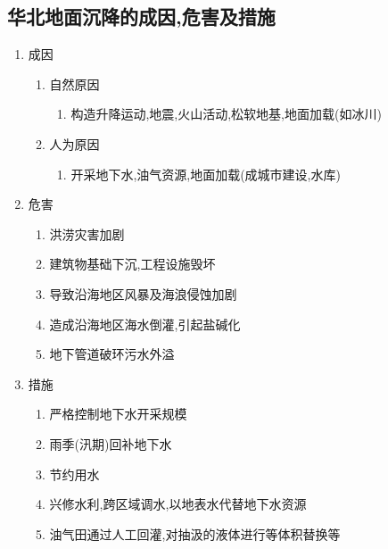 \documentclass[a4paper]{article}
\begin{document}
    \subsection{华北地面沉降的成因,危害及措施}
    \begin{enumerate}
        \item 成因
        \begin{enumerate}
            \item 自然原因
            \begin{enumerate}
                \item 构造升降运动,地震,火山活动,松软地基,地面加载(如冰川)
            \end{enumerate}
            \item 人为原因
            \begin{enumerate}
                \item 开采地下水,油气资源,地面加载(成城市建设,水库)
            \end{enumerate}
        \end{enumerate}
        \item 危害
        \begin{enumerate}
            \item 洪涝灾害加剧
            \item 建筑物基础下沉,工程设施毁坏
            \item 导致沿海地区风暴及海浪侵蚀加剧
            \item 造成沿海地区海水倒灌,引起盐碱化
            \item 地下管道破环污水外溢
        \end{enumerate}
        \item 措施
        \begin{enumerate}
            \item 严格控制地下水开采规模
            \item 雨季(汛期)回补地下水
            \item 节约用水
            \item 兴修水利,跨区域调水,以地表水代替地下水资源
            \item 油气田通过人工回灌,对抽汲的液体进行等体积替换等
        \end{enumerate}
    \end{enumerate}
\end{document}

